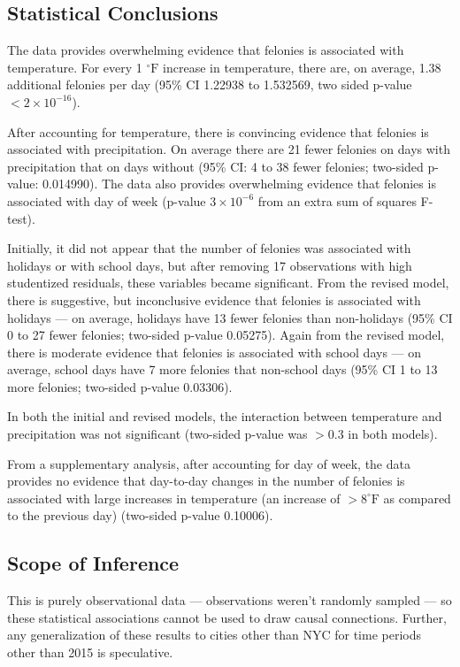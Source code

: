 \documentclass[11pt,notitlepage]{article}
\newcommand{\degf}{^\circ\text{F}}
\begin{document}
\subsection{Statistical Conclusions}

The data provides overwhelming evidence that felonies is associated with temperature. For every 1 $\degf$ increase in temperature, there are, on average, 1.38 additional felonies per day (95\% CI 1.22938 to 1.532569, two sided p-value $<2\times10^{-16}$).

After accounting for temperature, there is convincing evidence that felonies is associated with precipitation. On average there are 21 fewer felonies on days with precipitation that on days without (95\% CI: 4 to 38 fewer felonies; two-sided p-value: 0.014990). The data also provides overwhelming evidence that felonies is associated with day of week (p-value $3 \times 10^{-6}$ from an extra sum of squares F-test).

Initially, it did not appear that the number of felonies was associated with holidays or with school days, but after removing 17 observations with high studentized residuals, these variables became significant. From the revised model, there is suggestive, but inconclusive evidence that felonies is associated with holidays --- on average, holidays have 13 fewer felonies than non-holidays (95\% CI 0 to 27 fewer felonies; two-sided p-value 0.05275). Again from the revised model, there is moderate evidence that felonies is associated with school days --- on average, school days have 7 more felonies that non-school days (95\% CI 1 to 13 more felonies; two-sided p-value 0.03306).

In both the initial and revised models, the interaction between temperature and precipitation was not significant (two-sided p-value was $>0.3$ in both models).


From a supplementary analysis, after accounting for day of week, the data provides no evidence that day-to-day changes in the number of felonies is associated with large increases in temperature (an increase of $>8 \degf$ as compared to the previous day) (two-sided p-value 0.10006).


\subsection{Scope of Inference}

This is purely observational data --- observations weren't randomly sampled --- so these statistical associations cannot be used to draw causal connections. Further, any generalization of these results to cities other than NYC for time periods other than 2015 is speculative.



\listoftodos

\pagebreak

%
%
\end{document}

